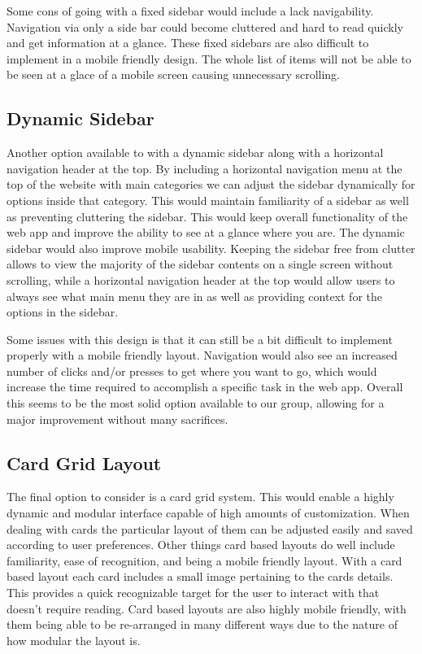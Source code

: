 \documentclass[10pt,draftclsnofoot,onecolumn,journal,compsoc]{IEEEtran}
\begin{document}
Some cons of going with a fixed sidebar would include a lack navigability. Navigation via only a side bar could become cluttered and hard to read quickly and get information at a glance. These fixed sidebars are also difficult to implement in a mobile friendly design. The whole list of items will not be able to be seen at a glace of a mobile screen causing unnecessary scrolling.

\subsection{Dynamic Sidebar}
Another option available to with a dynamic sidebar along with a horizontal navigation header at the top. By including a horizontal navigation menu at the top of the website with main categories we can adjust the sidebar dynamically for options inside that category. This would maintain familiarity of a sidebar as well as preventing cluttering the sidebar. This would keep overall functionality of the web app and improve the ability to see at a glance where you are. The dynamic sidebar would also improve mobile usability. Keeping the sidebar free from clutter allows to view the majority of the sidebar contents on a single screen without scrolling, while a horizontal navigation header at the top would allow users to always see what main menu they are in as well as providing context for the options in the sidebar.

Some issues with this design is that it can still be a bit difficult to implement properly with a mobile friendly layout. Navigation would also see an increased number of clicks and/or presses to get where you want to go, which would increase the time required to accomplish a specific task in the web app. Overall this seems to be the most solid option available to our group, allowing for a major improvement without many sacrifices.

\subsection{Card Grid Layout}
The final option to consider is a card grid system. This would enable a highly dynamic and modular interface capable of high amounts of customization. When dealing with cards the particular layout of them can be adjusted easily and saved according to user preferences. Other things card based layouts do well include familiarity, ease of recognition, and being a mobile friendly layout. With a card based layout each card includes a small image pertaining to the cards details. This provides a quick recognizable target for the user to interact with that doesn't require reading. Card based layouts are also highly mobile friendly, with them being able to be re-arranged in many different ways due to the nature of how modular the layout is.
\end{document}
